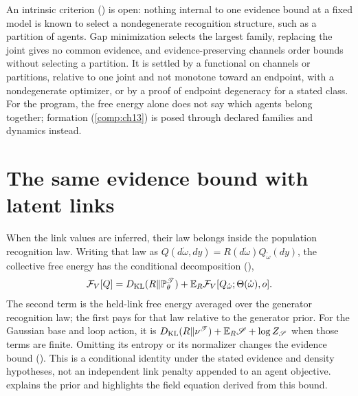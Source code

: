 An intrinsic criterion () is open: nothing internal to one evidence bound at
a fixed model is known to select a nondegenerate recognition structure, such as a partition of agents. Gap
minimization selects the largest family, replacing the joint gives no common evidence, and evidence-preserving
channels order bounds without selecting a partition. It is settled by a functional on channels or partitions,
relative to one joint and not monotone toward an endpoint, with a nondegenerate optimizer, or by a proof of
endpoint degeneracy for a stated class. For the program, the free energy alone does not say which agents belong
together; formation (\cref{comp:ch13}) is posed through declared families and dynamics instead.

\section{The same evidence bound with latent links}
\label{comp:ch05-latent-links}

When the link values are inferred, their law belongs inside the population recognition law.
Writing that law as $Q(d\mathring\omega,dy)=R(d\mathring\omega)Q_{\mathring\omega}(dy)$, the
collective free energy has the conditional decomposition
(),
\[
\mathcal F_V[Q]
=D_{\mathrm{KL}}(R\Vert\mathbb P^{\mathscr T}_\theta)
+\mathbb E_R\mathcal F_V[Q_{\mathring\omega};\Theta(\mathring\omega),o].
\]
The second term is the held-link free energy averaged over the generator recognition law; the
first pays for that law relative to the generator prior. For the Gaussian base and loop action,
it is $D_{\mathrm{KL}}(R\Vert\nu^{\mathscr T})+\mathbb E_R\mathscr S+\log Z_{\mathscr S}$ when those terms are
finite. Omitting its entropy or its normalizer changes the evidence bound
(). This is a \SOLID{} conditional identity under the stated
evidence and density hypotheses, not an independent link penalty appended to an agent objective.
 explains the prior and highlights the field equation derived from this bound.

